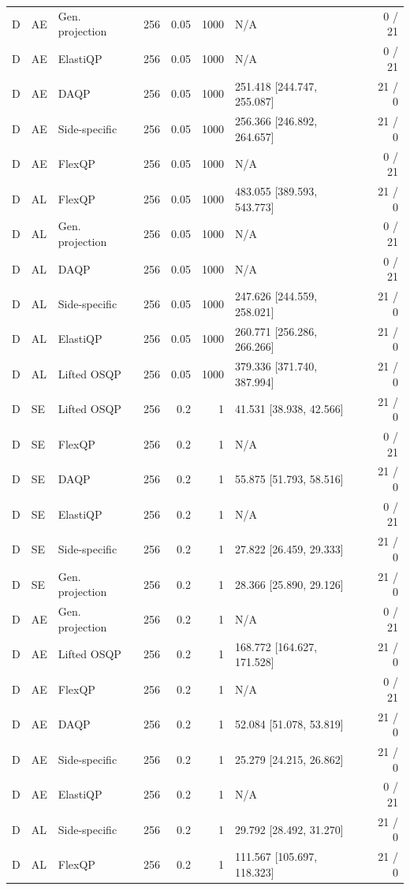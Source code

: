 \begin{longtable}{@{}lllrrrlr@{}}
D & AE & Gen. projection & 256 & 0.05 & 1000 & N/A & 0 / 21 \\
D & AE & ElastiQP & 256 & 0.05 & 1000 & N/A & 0 / 21 \\
D & AE & DAQP & 256 & 0.05 & 1000 & 251.418 [244.747, 255.087] & 21 / 0 \\
D & AE & Side-specific & 256 & 0.05 & 1000 & 256.366 [246.892, 264.657] & 21 / 0 \\
D & AE & FlexQP & 256 & 0.05 & 1000 & N/A & 0 / 21 \\
D & AL & FlexQP & 256 & 0.05 & 1000 & 483.055 [389.593, 543.773] & 21 / 0 \\
D & AL & Gen. projection & 256 & 0.05 & 1000 & N/A & 0 / 21 \\
D & AL & DAQP & 256 & 0.05 & 1000 & N/A & 0 / 21 \\
D & AL & Side-specific & 256 & 0.05 & 1000 & 247.626 [244.559, 258.021] & 21 / 0 \\
D & AL & ElastiQP & 256 & 0.05 & 1000 & 260.771 [256.286, 266.266] & 21 / 0 \\
D & AL & Lifted OSQP & 256 & 0.05 & 1000 & 379.336 [371.740, 387.994] & 21 / 0 \\
D & SE & Lifted OSQP & 256 & 0.2 & 1 & 41.531 [38.938, 42.566] & 21 / 0 \\
D & SE & FlexQP & 256 & 0.2 & 1 & N/A & 0 / 21 \\
D & SE & DAQP & 256 & 0.2 & 1 & 55.875 [51.793, 58.516] & 21 / 0 \\
D & SE & ElastiQP & 256 & 0.2 & 1 & N/A & 0 / 21 \\
D & SE & Side-specific & 256 & 0.2 & 1 & 27.822 [26.459, 29.333] & 21 / 0 \\
D & SE & Gen. projection & 256 & 0.2 & 1 & 28.366 [25.890, 29.126] & 21 / 0 \\
D & AE & Gen. projection & 256 & 0.2 & 1 & N/A & 0 / 21 \\
D & AE & Lifted OSQP & 256 & 0.2 & 1 & 168.772 [164.627, 171.528] & 21 / 0 \\
D & AE & FlexQP & 256 & 0.2 & 1 & N/A & 0 / 21 \\
D & AE & DAQP & 256 & 0.2 & 1 & 52.084 [51.078, 53.819] & 21 / 0 \\
D & AE & Side-specific & 256 & 0.2 & 1 & 25.279 [24.215, 26.862] & 21 / 0 \\
D & AE & ElastiQP & 256 & 0.2 & 1 & N/A & 0 / 21 \\
D & AL & Side-specific & 256 & 0.2 & 1 & 29.792 [28.492, 31.270] & 21 / 0 \\
D & AL & FlexQP & 256 & 0.2 & 1 & 111.567 [105.697, 118.323] & 21 / 0 \\

\end{longtable}
